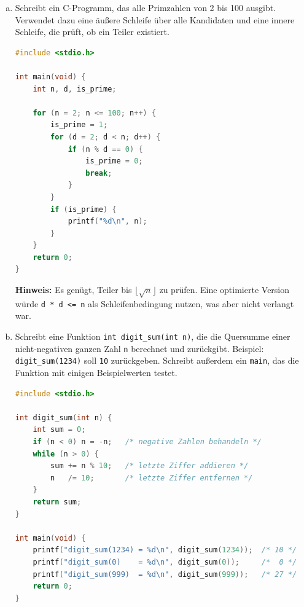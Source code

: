 \begin{enumerate}[a)]

\item Schreibt ein C-Programm, das alle Primzahlen von 2 bis 100 ausgibt.
Verwendet dazu eine äußere Schleife über alle Kandidaten und eine innere Schleife, die prüft, ob ein Teiler existiert.

\begin{loesung}
\begin{lstlisting}[language=C]
#include <stdio.h>

int main(void) {
    int n, d, is_prime;

    for (n = 2; n <= 100; n++) {
        is_prime = 1;
        for (d = 2; d < n; d++) {
            if (n % d == 0) {
                is_prime = 0;
                break;
            }
        }
        if (is_prime) {
            printf("%d\n", n);
        }
    }
    return 0;
}
\end{lstlisting}

\textbf{Hinweis:} Es genügt, Teiler bis $\lfloor\sqrt{n}\rfloor$ zu prüfen.
Eine optimierte Version würde \texttt{d * d <= n} als Schleifenbedingung nutzen, was aber nicht verlangt war.
\end{loesung}

\item Schreibt eine Funktion \texttt{int digit\_sum(int n)}, die die Quersumme einer
nicht-negativen ganzen Zahl \texttt{n} berechnet und zurückgibt.
Beispiel: \texttt{digit\_sum(1234)} soll \texttt{10} zurückgeben.
Schreibt außerdem ein \texttt{main}, das die Funktion mit einigen Beispielwerten testet.

\begin{loesung}
\begin{lstlisting}[language=C]
#include <stdio.h>

int digit_sum(int n) {
    int sum = 0;
    if (n < 0) n = -n;   /* negative Zahlen behandeln */
    while (n > 0) {
        sum += n % 10;   /* letzte Ziffer addieren */
        n   /= 10;       /* letzte Ziffer entfernen */
    }
    return sum;
}

int main(void) {
    printf("digit_sum(1234) = %d\n", digit_sum(1234));  /* 10 */
    printf("digit_sum(0)    = %d\n", digit_sum(0));     /*  0 */
    printf("digit_sum(999)  = %d\n", digit_sum(999));   /* 27 */
    return 0;
}
\end{lstlisting}
\end{loesung}

\end{enumerate}

